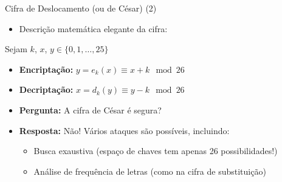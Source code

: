 \documentclass{beamer}
\begin{document}
\begin{frame}{Cifra de Deslocamento (ou de César) (2)}
\begin{itemize}
    \item Descrição matemática elegante da cifra:
\end{itemize}

\vspace{0.5em}
\begin{block}{}
Sejam $k$, $x$, $y \in \{0, 1, \dots, 25\}$
\begin{itemize}
    \item \textbf{Encriptação:} \quad $y = e_k(x) \equiv x + k \mod 26$
    \item \textbf{Decriptação:} \quad $x = d_k(y) \equiv y - k \mod 26$
\end{itemize}
\end{block}

\vspace{0.5em}
\begin{itemize}
    \item \textbf{Pergunta:} A cifra de César é segura?
    \item \textbf{Resposta:} Não! Vários ataques são possíveis, incluindo:
    \begin{itemize}
        \item Busca exaustiva (espaço de chaves tem apenas 26 possibilidades!)
        \item Análise de frequência de letras (como na cifra de substituição)
    \end{itemize}
\end{itemize}
\end{frame}
\end{document}
